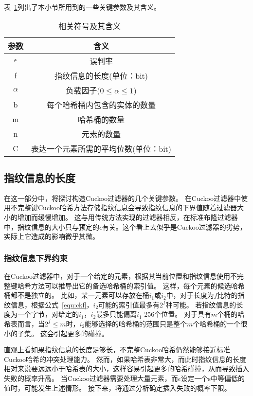 表~\ref{tab:ckf_para}列出了本小节所用到的一些关键参数及其含义。
\begin{table}[htbp]
  \centering
  \caption{相关符号及其含义}
  \label{tab:ckf_para}
  \begin{tabular}{cc}
    \toprule
      参数  & 含义  \\
    \midrule
      $\epsilon$  					  &   误判率 \\
        f 							  &   指纹信息的长度(单位：bit)\\
      $\alpha$					      &   负载因子($0\leq\alpha\leq 1$) \\
    	b                             &   每个哈希桶内包含的实体的数量 \\
    	m 							  &	  哈希桶的数量 \\
    	n                             &   元素的数量 \\
        C 							  &   表达一个元素所需的平均位数(单位：bit)\\
    \bottomrule
  \end{tabular}
\end{table}

\subsection{指纹信息的长度}
在这一部分中，将探讨构造Cuckoo过滤器的几个关键参数。
在Cuckoo过滤器中使用不完整键Cuckoo哈希方法存储指纹信息会导致指纹信息的下界值随着过滤器大小的增加而缓慢增加。
这与用传统方法实现的过滤器相反，在标准布隆过滤器中，指纹信息的大小只与预定的$\epsilon$有关。这个看上去似乎是Cuckoo过滤器的劣势，实际上它造成的影响微乎其微。

\subsubsection{指纹信息下界约束}
在Cuckoo过滤器中，对于一个给定的元素，根据其当前位置和指纹信息使用不完整键哈希方法可以推导出它的备选哈希桶的索引值。
这样，每个元素的候选哈希桶都不是独立的。
比如，某一元素可以存放在桶$i_1$或$i_2$中，对于长度为$f$比特的指纹信息，根据公式~\ref{equ:ckf}，$i_2$可能的索引值最多有$2^f$种可能。
若指纹信息的长度为一个字节，对给定的$i_1$，$i_2$最多只能偏离$i_1$ 256个位置。
对于具有$m$个桶的哈希表而言，当$2^f \leq m$时，$i_2$能够选择的哈希桶的范围只是整个$m$个哈希桶的一个很小的子集。
这会引起更多的碰撞。

直观上看如果指纹信息的长度足够长，不完整Cuckoo哈希仍然能够接近标准Cuckoo哈希的冲突处理能力。
然而，如果哈希表非常大，而此时指纹信息的长度相对来说要远远小于哈希表的大小，这样容易引起更多的哈希碰撞，从而导致插入失败的概率升高。
当Cuckoo过滤器需要处理大量元素，而$\epsilon$设定一个s中等偏低的值时，可能发生上述情形。
接下来，将通过分析确定插入失败的概率下限。


